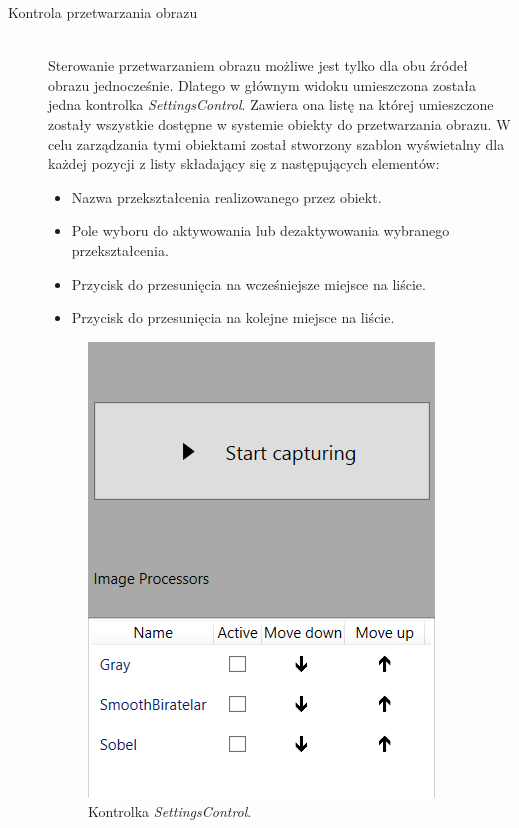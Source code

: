 \documentclass[a4paper,11pt,twoside]{report}
\theoremstyle{definition}
\begin{document}
\begin{description}
\item [Kontrola przetwarzania obrazu] \hfill \\
Sterowanie przetwarzaniem obrazu możliwe jest tylko dla obu źródeł obrazu jednocześnie. Dlatego w głównym widoku umieszczona została jedna kontrolka \textit{SettingsControl}. Zawiera ona listę na której umieszczone zostały wszystkie dostępne w systemie obiekty do przetwarzania obrazu. W celu zarządzania tymi obiektami został stworzony szablon wyświetalny dla każdej pozycji z listy składający się z następujących elementów:

\begin{itemize}
\item Nazwa przekształcenia realizowanego przez obiekt.
\item Pole wyboru do aktywowania lub dezaktywowania wybranego przekształcenia.
\item Przycisk do przesunięcia na wcześniejsze miejsce na liście.
\item Przycisk do przesunięcia na kolejne miejsce na liście.
\end{itemize}

\begin{figure}[h]
\centering
\includegraphics[scale=0.5]{images/settingscontrol_screen}
\caption[Widok aplikacji]{Kontrolka \textit{SettingsControl}.}
\end{figure}


\end{description}
\end{document}
